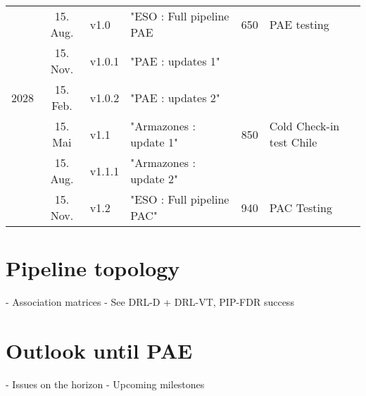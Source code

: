 \documentclass[a4paper]{spie}  %
\begin{document}
\begin{table}[]
\begin{tabular}{lcllll}
                                  & 15. Aug.      & v1.0             &"ESO : Full pipeline PAE         & {650}                & PAE testing                          \\
                                  & 15. Nov.      & v1.0.1           & "PAE : updates 1"               &                                        &                                      \\
{2028}          & 15. Feb.      & v1.0.2           & "PAE : updates 2"               &                                        &                                      \\
                                  & 15. Mai       & v1.1             & "Armazones : update 1"            & {850}                & Cold Check-in test Chile             \\
                                  & 15. Aug.      & v1.1.1           &"Armazones : update 2"          &                                        &                                      \\
                                  & 15. Nov.      & v1.2             & "ESO : Full pipeline PAC"         & {940}                & PAC Testing                         
\end{tabular}
\end{table}

\section{Pipeline topology}
\label{sec:pip}
- Association matrices
- See DRL-D + DRL-VT, PIP-FDR success




\section{Outlook until PAE}
\label{sec:outlook}
- Issues on the horizon
- Upcoming milestones


\appendix    %

\acknowledgments %


\end{document}
